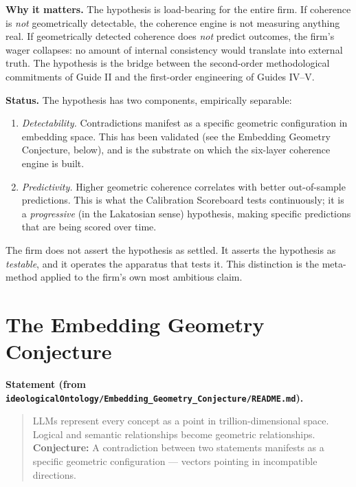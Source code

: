 \documentclass[11pt,letterpaper]{article}
\newcommand{\file}[1]{\texttt{#1}}
\begin{document}
\textbf{Why it matters.} The hypothesis is load-bearing for the entire firm. If coherence is \emph{not} geometrically detectable, the coherence engine is not measuring anything real. If geometrically detected coherence does \emph{not} predict outcomes, the firm's wager collapses: no amount of internal consistency would translate into external truth. The hypothesis is the bridge between the second-order methodological commitments of Guide II and the first-order engineering of Guides IV--V.

\textbf{Status.} The hypothesis has two components, empirically separable:

\begin{enumerate}[leftmargin=1.5em,itemsep=0.2em]
\item \emph{Detectability.} Contradictions manifest as a specific geometric configuration in embedding space. This has been validated (see the Embedding Geometry Conjecture, below), and is the substrate on which the six-layer coherence engine is built.
\item \emph{Predictivity.} Higher geometric coherence correlates with better out-of-sample predictions. This is what the Calibration Scoreboard tests continuously; it is a \emph{progressive} (in the Lakatosian sense) hypothesis, making specific predictions that are being scored over time.
\end{enumerate}

The firm does not assert the hypothesis as settled. It asserts the hypothesis as \emph{testable}, and it operates the apparatus that tests it. This distinction is the meta-method applied to the firm's own most ambitious claim.

\section{The Embedding Geometry Conjecture}

\textbf{Statement (from \file{ideologicalOntology/Embedding\_Geometry\_Conjecture/README.md}).}

\begin{quote}
LLMs represent every concept as a point in trillion-dimensional space. Logical and semantic relationships become geometric relationships. \textbf{Conjecture:} A contradiction between two statements manifests as a specific geometric configuration --- vectors pointing in incompatible directions.
\end{quote}
\end{document}
